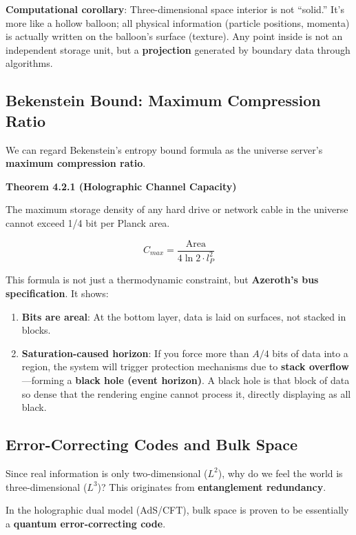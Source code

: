 \textbf{Computational corollary}:
Three-dimensional space interior is not ``solid.'' It's more like a hollow balloon; all physical information (particle positions, momenta) is actually written on the balloon's surface (texture). Any point inside is not an independent storage unit, but a \textbf{projection} generated by boundary data through algorithms.

\subsection{Bekenstein Bound: Maximum Compression Ratio}

We can regard Bekenstein's entropy bound formula as the universe server's \textbf{maximum compression ratio}.

\textbf{Theorem 4.2.1 (Holographic Channel Capacity)}

The maximum storage density of any hard drive or network cable in the universe cannot exceed 1/4 bit per Planck area.

\[
C_{max} = \frac{\text{Area}}{4 \ln 2 \cdot l_P^2}
\]

This formula is not just a thermodynamic constraint, but \textbf{Azeroth's bus specification}. It shows:

\begin{enumerate}
\item \textbf{Bits are areal}: At the bottom layer, data is laid on surfaces, not stacked in blocks.
\item \textbf{Saturation-caused horizon}: If you force more than $A/4$ bits of data into a region, the system will trigger protection mechanisms due to \textbf{stack overflow}---forming a \textbf{black hole (event horizon)}. A black hole is that block of data so dense that the rendering engine cannot process it, directly displaying as all black.
\end{enumerate}

\subsection{Error-Correcting Codes and Bulk Space}

Since real information is only two-dimensional ($L^2$), why do we feel the world is three-dimensional ($L^3$)?
This originates from \textbf{entanglement redundancy}.

In the holographic dual model (AdS/CFT), bulk space is proven to be essentially a \textbf{quantum error-correcting code}.

